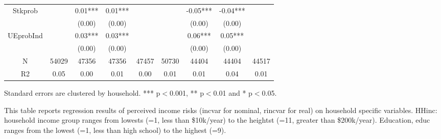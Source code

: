 \begin{table}[p]
\begin{adjustbox}{width={0.9\textwidth}}
\begin{threeparttable}
\begin{tabular}{ccccccccc}
Stkprob          &          &   0.01*** &    0.01*** &             &           &   -0.05*** &    -0.04*** &              \\
                 &          &    (0.00) &     (0.00) &             &           &     (0.00) &      (0.00) &              \\
UEprobInd        &          &   0.03*** &    0.03*** &             &           &    0.06*** &     0.05*** &              \\
                 &          &    (0.00) &     (0.00) &             &           &     (0.00) &      (0.00) &              \\
N                &    54029 &     47356 &      47356 &       47457 &     50730 &      44404 &       44404 &        44517 \\
R2               &     0.05 &      0.00 &       0.01 &        0.00 &      0.01 &       0.01 &        0.04 &         0.01 \\
\bottomrule
\end{tabular}
\begin{tablenotes}\item Standard errors are clustered by household. *** p$<$0.001, ** p$<$0.01 and * p$<$0.05. 
\item This table reports regression results of perceived income risks (incvar for nominal, rincvar for real) on household specific variables. HHinc: household income group ranges from lowests (=1, less than \$10k/year) to the heightst (=11, greater than \$200k/year). Education, educ ranges from the lowest (=1, less than high school) to the highest (=9).
\end{tablenotes}
\end{threeparttable}
\end{adjustbox}
\end{table}